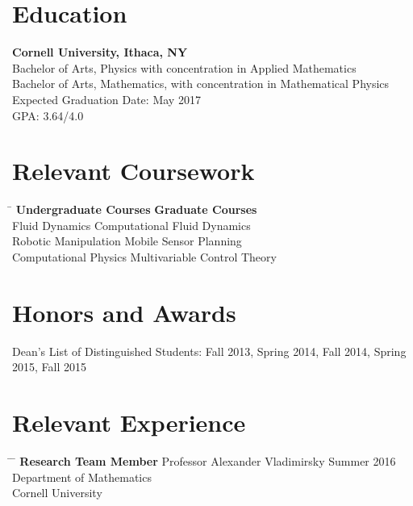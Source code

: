 \documentclass[12pt]{res}
\begin{document}
\begin{resume}
  \section{Education}

	\noindent
    {\bf Cornell University, Ithaca, NY}\\
    Bachelor of Arts, Physics with concentration in Applied Mathematics\\
    Bachelor of Arts, Mathematics, with concentration in Mathematical Physics\\
    Expected Graduation Date: May 2017 \\
    GPA: 3.64/4.0

  \vspace{-12pt}
  \section{Relevant Coursework}
  \vspace{-10pt}
    \begin{tabbing}
    \hspace{3.0in} \= \kill
    {\bf Undergraduate Courses } \> {\bf Graduate Courses} \\
    Fluid Dynamics		\>	Computational Fluid Dynamics\\
    Robotic Manipulation	\>	Mobile Sensor Planning\\
    Computational Physics	\>	Multivariable Control Theory\\
    \end{tabbing}


  \vspace{-12pt}
  \section{Honors and Awards}
	\noindent
    Dean's List of Distinguished Students: Fall 2013, Spring 2014, Fall 2014, Spring 2015, Fall 2015\\


  \vspace{-10pt}
  \section{Relevant Experience}
   
    \vspace{-5pt} 
    \begin{tabbing}
      \hspace{2.3in} \= \hspace{2.6in} \= \kill
      {\bf Research Team Member} \> Professor Alexander Vladimirsky  \> Summer 2016 \\
		\> Department of Mathematics\\
		\> Cornell University \\
    \end{tabbing}


\end{resume}
\end{document}
